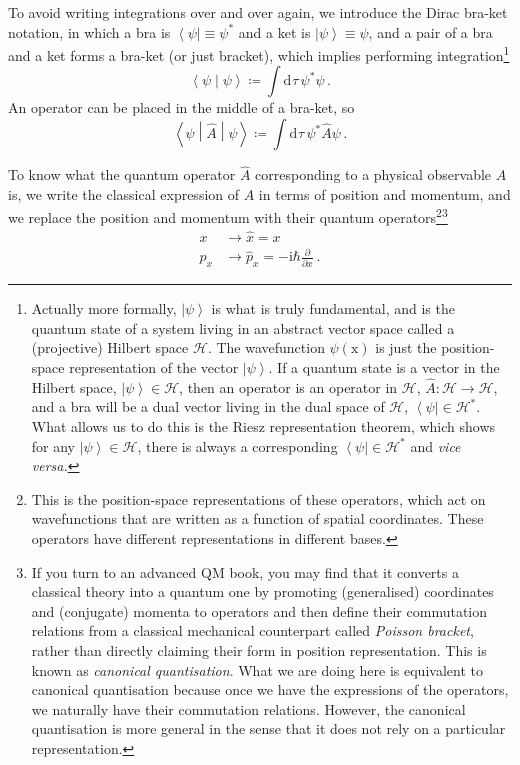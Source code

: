 \documentclass{article}
\theoremstyle{plain}\theoremheaderfont{\normalfont\itshape}\theorembodyfont{\rmfamily}\theoremseparator{.}\newtheorem*{rem}{Remark}\newtheorem*{ex}{Example}\newtheorem*{proof}{Proof}\newtheorem*{altp}{Alternative proof}
\theoremstyle{plain}\theoremheaderfont{\normalfont\bfseries}\theorembodyfont{\rmfamily}\theoremseparator{.}\newtheorem{thm}{Theorem}[section]\newtheorem{lem}[thm]{Lemma}\newtheorem{prop}[thm]{Proposition}\newtheorem*{cor}{Corollary}\newtheorem{defn}[thm]{Definition}\newtheorem{clm}[thm]{Claim}\newtheorem{clminproof}{Claim}
\theoremstyle{break}\theoremheaderfont{\normalfont\itshape}\theorembodyfont{\rmfamily}\theoremseparator{.\medskip}\newtheorem*{proofskip}{Proof}\newtheorem*{exs}{Examples}\newtheorem*{rems}{Remarks}
\theoremstyle{break}\theoremheaderfont{\normalfont\bfseries}\theorembodyfont{\rmfamily}\theoremseparator{.\medskip}\newtheorem{lemskip}[thm]{Lemma}\newtheorem{defnskip}[thm]{Definition}\newtheorem{propskip}[thm]{Proposition}\newtheorem{thmskip}[thm]{Theorem}
\numberwithin{equation}{section}
\newcommand{\ii}{\mathrm{i}}
\newcommand{\dd}[2][]{\mathrm{d}^{#1} #2\,}
\newcommand{\pdv}[3][]{\frac{\partial^{#1} #2}{{\partial #3}^{#1}}}
\newcommand{\bra}[1]{\left\langle #1 \right|}
\newcommand{\ket}[1]{\left| #1 \right\rangle}
\newcommand{\braket}[2]{\left\langle #1 \middle| #2 \right\rangle}
\newcommand{\mel}[3]{\left\langle #1 \middle| #2 \middle| #3 \right\rangle}
\newcommand{\vb}[1]{\bm{\mathrm{#1}}}
\begin{document}
    To avoid writing integrations over and over again, we introduce the Dirac bra-ket notation, in which a bra is \(\bra{\psi}\equiv\psi^*\) and a ket is \(\ket{\psi}\equiv\psi\), and a pair of a bra and a ket forms a bra-ket (or just bracket), which implies performing integration\footnote{Actually more formally, \(\ket{\psi}\) is what is truly fundamental, and is the quantum state of a system living in an abstract vector space called a (projective) Hilbert space \(\mathcal{H}\). The wavefunction \(\psi(\vb{x})\) is just the position-space representation of the vector \(\ket{\psi}\). If a quantum state is a vector in the Hilbert space, \(\ket{\psi}\in\mathcal{H}\), then an operator is an operator in \(\mathcal{H}\), \(\hat{A}:\mathcal{H}\to\mathcal{H}\), and a bra will be a dual vector living in the dual space of \(\mathcal{H}\), \(\bra{\psi}\in\mathcal{H}^*\). What allows us to do this is the Riesz representation theorem, which shows for any \(\ket{\psi}\in\mathcal{H}\), there is always a corresponding \(\bra{\psi}\in\mathcal{H}^*\) and \textit{vice versa.}}
    \begin{equation}
        \braket{\psi}{\psi}\coloneqq\int\dd{\tau}\psi^*\psi\,.
    \end{equation}
    An operator can be placed in the middle of a bra-ket, so
    \begin{equation}
        \mel{\psi}{\hat{A}}{\psi}\coloneqq\int\dd{\tau}\psi^*\hat{A}\psi\,.
    \end{equation}

    To know what the quantum operator \(\hat{A}\) corresponding to a physical observable \(A\) is, we write the classical expression of \(A\) in terms of position and momentum, and we replace the position and momentum with their quantum operators\footnote{This is the position-space representations of these operators, which act on wavefunctions that are written as a function of spatial coordinates. These operators have different representations in different bases.}\footnote{If you turn to an advanced QM book, you may find that it converts a classical theory into a quantum one by promoting (generalised) coordinates and (conjugate) momenta to operators and then define their commutation relations from a classical mechanical counterpart called \textit{Poisson bracket}, rather than directly claiming their form in position representation. This is known as \textit{canonical quantisation}. What we are doing here is equivalent to canonical quantisation because once we have the expressions of the operators, we naturally have their commutation relations. However, the canonical quantisation is more general in the sense that it does not rely on a particular representation.}
    \begin{align}
        x&\longrightarrow \hat{x}=x\\
        p_x&\longrightarrow \hat{p}_x=-\ii\hbar\pdv{}{x}\,.
    \end{align}
\end{document}
